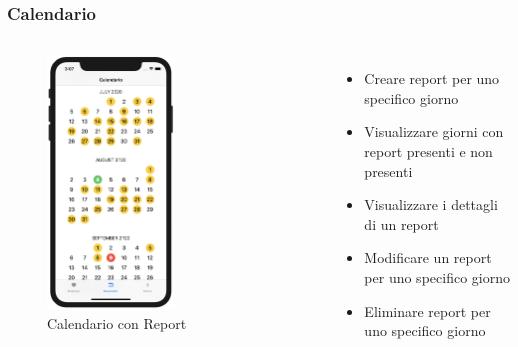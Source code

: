 \documentclass{beamer}
\begin{document}
\begin{frame}
\frametitle{Calendario}
\begin{columns}
	\begin{figure}[h]
        \includegraphics[width=0.55\textwidth]{../img/calendario1.png}
        \caption{Calendario con Report}
   \end{figure}
   
  \begin{itemize}
	\item Creare report per uno specifico giorno
	\item Visualizzare giorni con report presenti e non presenti
	\item Visualizzare i dettagli di un report
	\item Modificare un report per uno specifico giorno
	\item Eliminare report per uno specifico giorno
  \end{itemize}
\end{columns}
\end{frame}
\end{document}
